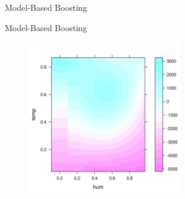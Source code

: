\documentclass[11pt,compress,t,notes=noshow, xcolor=table]{beamer}
\begin{document}
\begin{vbframe}{Model-Based Boosting}
\tiny

\end{vbframe}


\begin{vbframe}{Model-Based Boosting}
\begin{figure}
  \includegraphics[width = 0.6\textwidth]{figure/mboost_effect_plot.png}
\end{figure}
\end{vbframe}
\end{document}

